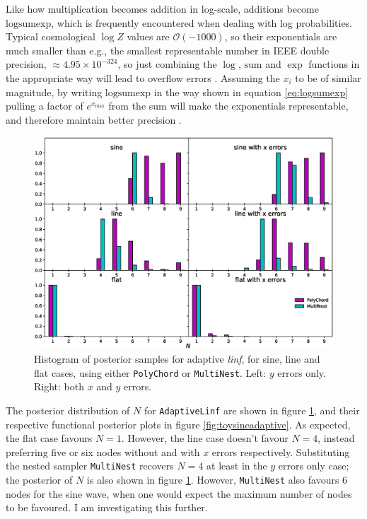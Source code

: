 \documentclass{article}
\begin{document}
Like how multiplication becomes addition in log-scale, additions become $\textrm{logsumexp}$, which is frequently encountered when dealing with log probabilities. Typical cosmological $\log Z$ values are $\mathcal{O}\left(-1000\right)$, so their exponentials are much smaller than e.g., the smallest representable number in IEEE double precision, $\approx4.95\times10^{-324}$, so just combining the $\log$, $\textrm{sum}$ and $\exp$ functions in the appropriate way will lead to overflow errors \cite{IEEE}. Assuming the $x_i$ to be of similar magnitude, by writing $\textrm{logsumexp}$ in the way shown in equation \ref{eq:logsumexp} pulling a factor of $e^{x_\textrm{max}}$ from the sum will make the exponentials representable, and therefore maintain better precision \cite{logsumexp}.

\begin{figure}[!hb]
  \centering
  \includegraphics[width=14cm]{toysineN.eps}
  \caption{Histogram of posterior samples for adaptive \textit{linf}, for sine, line and flat cases, using either \texttt{PolyChord} or \texttt{MultiNest}. Left: $y$ errors only. Right: both $x$ and $y$ errors.}
  \label{fig:toysineN}
\end{figure}

The posterior distribution of $N$ for \texttt{AdaptiveLinf} are shown in figure \ref{fig:toysineN}, and their respective functional posterior plots in figure \ref{fig:toysineadaptive}. As expected, the flat case favours $N=1$. However, the line case doesn't favour $N=4$, instead preferring five or six nodes without and with $x$ errors respectively. Substituting the nested sampler \texttt{MultiNest} recovers $N=4$ at least in the $y$ errors only case; the posterior of $N$ is also shown in figure \ref{fig:toysineN}. However, \texttt{MultiNest} also favours 6 nodes for the sine wave, when one would expect the maximum number of nodes to be favoured. I am investigating this further. 
\end{document}
